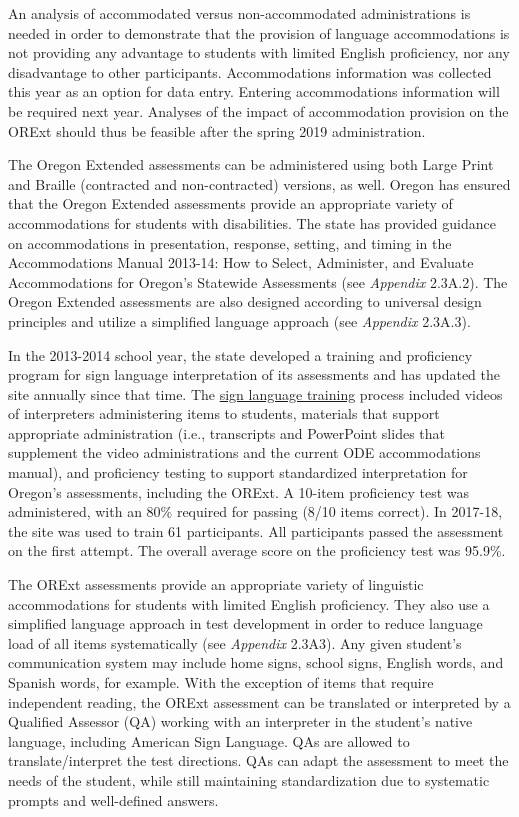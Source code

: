 \documentclass[]{article}
\begin{document}
An analysis of accommodated versus non-accommodated administrations is
needed in order to demonstrate that the provision of language
accommodations is not providing any advantage to students with limited
English proficiency, nor any disadvantage to other participants.
Accommodations information was collected this year as an option for data
entry. Entering accommodations information will be required next year.
Analyses of the impact of accommodation provision on the ORExt should
thus be feasible after the spring 2019 administration.

The Oregon Extended assessments can be administered using both Large
Print and Braille (contracted and non-contracted) versions, as well.
Oregon has ensured that the Oregon Extended assessments provide an
appropriate variety of accommodations for students with disabilities.
The state has provided guidance on accommodations in presentation,
response, setting, and timing in the Accommodations Manual 2013-14: How
to Select, Administer, and Evaluate Accommodations for Oregon's
Statewide Assessments (see \emph{Appendix} 2.3A.2). The Oregon Extended
assessments are also designed according to universal design principles
and utilize a simplified language approach (see \emph{Appendix} 2.3A.3).

In the 2013-2014 school year, the state developed a training and
proficiency program for sign language interpretation of its assessments
and has updated the site annually since that time. The
\color{link}\href{http://lms.brtprojects.org}{sign language training}
\color{black} process included videos of interpreters administering
items to students, materials that support appropriate administration
(i.e., transcripts and PowerPoint slides that supplement the video
administrations and the current ODE accommodations manual), and
proficiency testing to support standardized interpretation for Oregon's
assessments, including the ORExt. A 10-item proficiency test was
administered, with an 80\% required for passing (8/10 items correct). In
2017-18, the site was used to train 61 participants. All participants
passed the assessment on the first attempt. The overall average score on
the proficiency test was 95.9\%.

The ORExt assessments provide an appropriate variety of linguistic
accommodations for students with limited English proficiency. They also
use a simplified language approach in test development in order to
reduce language load of all items systematically (see \emph{Appendix}
2.3A3). Any given student's communication system may include home signs,
school signs, English words, and Spanish words, for example. With the
exception of items that require independent reading, the ORExt
assessment can be translated or interpreted by a Qualified Assessor (QA)
working with an interpreter in the student's native language, including
American Sign Language. QAs are allowed to translate/interpret the test
directions. QAs can adapt the assessment to meet the needs of the
student, while still maintaining standardization due to systematic
prompts and well-defined answers.
\end{document}
